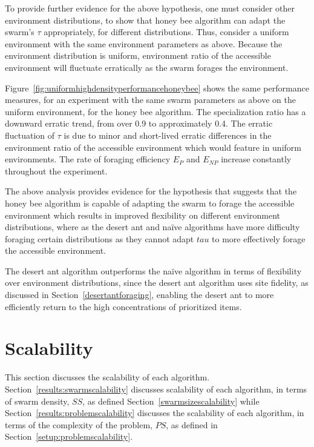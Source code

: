 To provide further evidence for the above hypothesis, one must consider other environment distributions, to show that honey bee algorithm can adapt the swarm's $\tau$ appropriately, for different distributions. Thus, consider a uniform environment with the same environment parameters as above. Because the environment distribution is uniform, environment ratio of the accessible environment will fluctuate erratically as the swarm forages the environment.  

Figure~\ref{fig:uniformhighdensityperformancehoneybee} shows the same performance measures, for an experiment with the same swarm parameters as above on the uniform environment, for the honey bee algorithm. The specialization ratio has a downward erratic trend, from over 0.9 to approximately 0.4. The erratic fluctuation of $\tau$ is due to minor and short-lived erratic differences in the environment ratio of the accessible environment which would feature in uniform environments. The rate of foraging efficiency $E_P$ and $E_{NP}$  increase constantly throughout the experiment. 

The above analysis provides evidence for the hypothesis that suggests that the honey bee algorithm is capable of adapting the swarm to forage the accessible environment which results in improved flexibility on different environment distributions, where as the desert ant and na\"ive algorithms have more difficulty foraging certain distributions as they cannot adapt $
tau$ to more effectively forage the accessible environment.



The desert ant algorithm outperforms the na\"ive algorithm in terms of flexibility over environment distributions, since the desert ant algorithm uses site fidelity, as discussed in Section~\ref{desertantforaging}, enabling the desert ant to more efficiently return to the high concentrations of prioritized items.



\section{Scalability}
\label{results:scalability}

This section discusses the scalability of each algorithm. Section~\ref{results:swarmscalability} discusses scalability of each algorithm, in terms of swarm density, $SS$, as defined Section~\ref{swarmsizescalability} while Section~\ref{results:problemscalability} discusses the scalability of each algorithm, in terms of the complexity of the problem, $PS$, as defined in Section~\ref{setup:problemscalability}.

